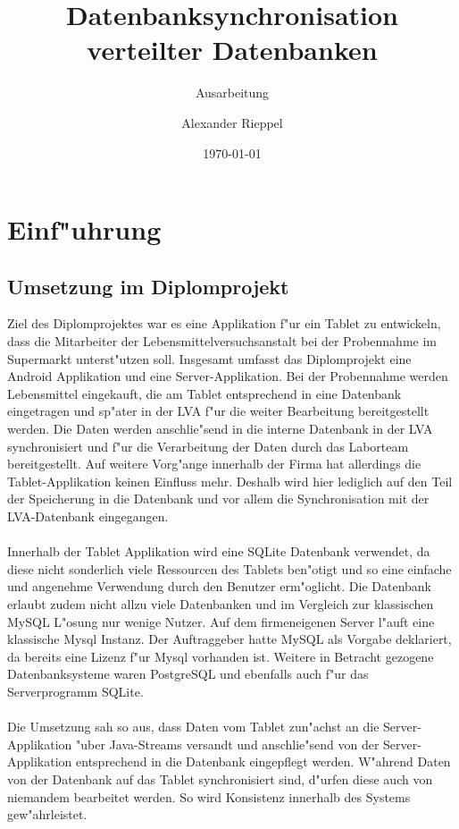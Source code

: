 \documentclass[a4paper,14pt]{scrreprt}
\begin{document}
\author{Alexander Rieppel} %
\title{Datenbanksynchronisation verteilter Datenbanken} %
\subject{VSDB} %
\subtitle{Ausarbeitung} %
\date{\today} %
\publishers{5AHITT} %

\maketitle
\tableofcontents
 

\chapter{Einf"uhrung}
\section{Umsetzung im Diplomprojekt}
Ziel des Diplomprojektes war es eine Applikation f"ur ein Tablet zu entwickeln, dass die Mitarbeiter der Lebensmittelversuchsanstalt bei der Probennahme im Supermarkt unterst"utzen soll. Insgesamt umfasst das Diplomprojekt eine Android Applikation und eine Server-Applikation. Bei der Probennahme werden Lebensmittel eingekauft, die am Tablet entsprechend in eine Datenbank eingetragen und sp"ater in der LVA f"ur die weiter Bearbeitung bereitgestellt werden. Die Daten werden anschlie"send in die interne Datenbank in der LVA synchronisiert und f"ur die Verarbeitung der Daten durch das Laborteam bereitgestellt. Auf weitere Vorg"ange innerhalb der Firma hat allerdings die Tablet-Applikation keinen Einfluss mehr. Deshalb wird hier lediglich auf den Teil der Speicherung in die Datenbank und vor allem die Synchronisation mit der LVA-Datenbank eingegangen. \\\\Innerhalb der Tablet Applikation wird eine SQLite Datenbank verwendet, da diese nicht sonderlich viele Ressourcen des Tablets ben"otigt und so eine einfache und angenehme Verwendung durch den Benutzer erm"oglicht. Die Datenbank erlaubt zudem nicht allzu viele Datenbanken und im Vergleich zur klassischen MySQL L"osung nur wenige Nutzer. Auf dem firmeneigenen Server l"auft eine klassische Mysql Instanz. Der Auftraggeber hatte MySQL als Vorgabe deklariert, da bereits eine Lizenz f"ur Mysql vorhanden ist. Weitere in Betracht gezogene Datenbanksysteme waren PostgreSQL und ebenfalls auch f"ur das Serverprogramm SQLite. \\\\ Die Umsetzung sah so aus, dass Daten vom Tablet zun"achst an die Server-Applikation "uber Java-Streams versandt und anschlie"send von der Server-Applikation entsprechend in die Datenbank eingepflegt werden. W"ahrend Daten von der Datenbank auf das Tablet synchronisiert sind, d"urfen diese auch von niemandem bearbeitet werden. So wird Konsistenz innerhalb des Systems gew"ahrleistet.\cite{diploMeins}
\end{document}
